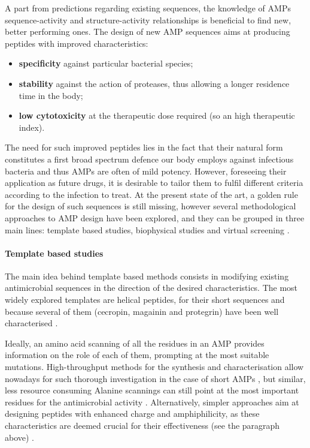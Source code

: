 A part from predictions regarding existing sequences, the knowledge of AMPs sequence-activity and structure-activity relationships is beneficial to find new, better performing ones. The design of new AMP sequences aims at producing peptides with improved characteristics:
\begin{itemize}
\item \textbf{specificity} against particular bacterial species;
\item \textbf{stability} against the action of proteases, thus allowing a longer residence time in the body;
\item \textbf{low cytotoxicity} at the therapeutic dose required (so an high therapeutic index).
\end{itemize}
The need for such improved peptides lies in the fact that their natural form constitutes a first broad spectrum defence our body employs against infectious bacteria and thus AMPs are often of mild potency. However, foreseeing their application as future drugs, it is desirable to tailor them to fulfil different criteria according to the infection to treat.
%
At the present state of the art, a golden rule for the design of such sequences is still missing, however several methodological approaches to AMP design have been explored, and they can be grouped in three main lines: template based studies, biophysical studies and virtual screening \cite{Fjell2011}.

\paragraph{Template based studies}
The main idea behind template based methods consists in modifying existing antimicrobial sequences in the direction of the desired characteristics. The most widely explored templates are helical peptides, for their short sequences and because several of them (cecropin, magainin and protegrin) have been well characterised \cite{Wang2015}.

Ideally, an amino acid scanning of all the residues in an AMP provides information on the role of each of them, prompting at the most suitable mutations. High-throughput methods for the synthesis and characterisation allow nowadays for such thorough investigation in the case of short AMPs \cite{Hilpert2005}, but similar, less resource consuming Alanine scannings can still point at the most important residues for the antimicrobial activity \cite{Migon2018}.
%
Alternatively, simpler approaches aim at designing peptides with enhanced charge and amphiphilicity, as these characteristics are deemed crucial for their effectiveness (see the paragraph above) \cite{Wang2015}.

